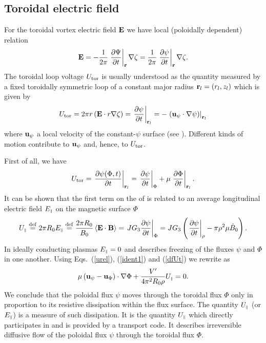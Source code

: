 \subsection{Toroidal electric field}

For the toroidal vortex electric field ${\bf E}$ we have local
(poloidally dependent) relation 
\begin{equation}
\label{vecE}
{\bf E}
=-\frac{1}{2\pi}\left.\displaystyle{\partial \Psi\over\partial t}\right|_{\bf r}\nabla\zeta
=\frac{1}{2\pi}\left.\displaystyle{\partial \psi\over\partial t}\right|_{\bf r}\nabla\zeta
.\end{equation}
The toroidal loop voltage 
$U_{\rm tor}$
is usually understood as the quantity measured by a fixed toroidally
symmetric loop of a constant major radius ${\bf r}_l=(r_l,z_l)$ which is
given by 
\begin{equation}
\label{dfUt}
U_{\rm tor}=2\pi r\left({\bf E}\cdot r\nabla\zeta\right)
=\displaystyle\left.\displaystyle{\partial \psi\over\partial t}\right|_{{\bf r}_l}
=-\left.\left({\bf u}_\psi\cdot\nabla\psi\right)\right|_{{\bf r}_l}
\end{equation}
where ${\bf u}_\psi$ a local velocity of the constant-$\psi$ surface
(see ). Different kinds of motion contribute to ${\bf u}_\psi$
and, hence, to $U_{\rm tor}$.  

First of all, we have 
\begin{equation}
\label{UPhi}
U_{\rm tor}
=\left.\displaystyle{\partial \psi(\Phi,t)\over\partial t}\right|_{{\bf r}_l}
=\left.\displaystyle{\partial \psi\over\partial t}\right|_\Phi
+\mu\left.\displaystyle{\partial \Phi\over\partial t}\right|_{{\bf r}_l}
.\end{equation}
It can be shown \cite{HH} that the first term on the \rhs  of 
is related to an average longitudinal electric field $E_{\scriptscriptstyle\parallel}$ on the
magnetic surface $\Phi$ 
\begin{equation}
\label{dfEp}
U_{\scriptscriptstyle\parallel}
\stackrel{{\rm def}}{=}
2\pi R_0 E_{\scriptscriptstyle\parallel}
\stackrel{{\rm def}}{=}
\frac{2\pi R_0}{B_0}\left<\bf E\cdot B\right>
=\left.JG_3\displaystyle{\partial \psi\over\partial t}\right|_\Phi
=JG_3\left(\left.\displaystyle{\partial \psi\over\partial t}\right|_\rho-\pi\rho^2\mu\dot B_0\right)
.\end{equation}
In ideally conducting plasmas $E_{\scriptscriptstyle\parallel}=0$ and 
 describes freezing of the fluxes $\psi$ and $\Phi$ in one
another. 
Using Eqs.~(\ref{urel}), (\ref{ident1}) and (\ref{dfUt}) we rewrite
 as 
\begin{equation}
\label{psivsPhi}
\mu\left({\bf u}_\psi
-{\bf u}_\Phi\right)\cdot\nabla\Phi
+\frac{V'}{4\pi^2 R_0\rho}U_{\scriptscriptstyle\parallel}
=0
.\end{equation}
We conclude that the poloidal flux $\psi$ moves through the toroidal
flux $\Phi$ only in proportion to its resistive dissipation within the
flux surface. 
The quantity $U_{\scriptscriptstyle\parallel}$ (or $E_{\scriptscriptstyle\parallel}$) is a measure of such dissipation. 
It is the quantity $U_{\scriptscriptstyle\parallel}$ which directly participates in and is
provided by a transport code. 
It describes irreversible diffusive flow of the poloidal flux $\psi$
through the toroidal flux $\Phi.$ 

